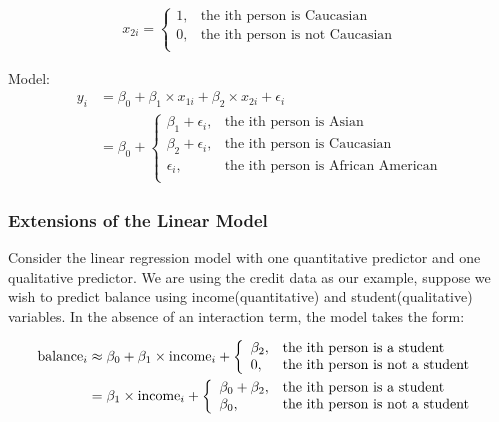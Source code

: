 \documentclass[12pt,a4paper]{article}%
\theoremstyle{definition}
\theoremstyle{plain}
\numberwithin{equation}{section}
\newcounter{subsubsubsection}[subsubsection]
\begin{document}
\begin{gather}
x_{2i} = \left\{
\begin{array}{ll}
1, & \mbox{the ith person is Caucasian}\\
0, & \mbox{the ith person is not Caucasian}\\
\end{array} \right.
\end{gather}

Model: 
\begin{align}
y_{i} & = \beta_{0}+\beta_{1} \times x_{1i} + \beta_{2} \times x_{2i} + \epsilon_{i} \\ 
      & = \beta_{0} + \left\{
		\begin{array}{ll}
			\beta_{1} +\epsilon_{i}, & \mbox{the ith person is Asian}\\
			\beta_{2} +\epsilon_{i}, & \mbox{the ith person is Caucasian}\\
			\epsilon_{i}, & \mbox{the ith person is African American}\\
		\end{array} \right.
\end{align}

\subsubsection{\textbf{Extensions of the Linear Model}}
\subsubsubsection{\color{blue}{Interaction Effect}}
Consider the linear regression model with one quantitative predictor and one qualitative predictor.
 We are using the credit data as our example, suppose we wish to predict balance using income(quantitative) and student(qualitative) variables. 
 In the absence of an interaction term, the model takes the form:

\begin{align}
{\rm balance}_{i} & \approx \beta_{0}+ \beta_{1} \times {\rm income}_{i} + \left\{
		\begin{array}{ll}
			\beta_{2} , & \mbox{the ith person is a student}\\
			0, & \mbox{the ith person is not a student }\\
		\end{array} \right. \\
& = \beta_{1} \times {\rm income}_{i} + \left\{
		\begin{array}{ll}
			\beta_{0} + \beta_{2} , & \mbox{the ith person is a student}\\
			\beta_{0}, & \mbox{the ith person is not a student }\\
		\end{array} \right.
\label{non-interaction}
\end{align}
\end{document}
